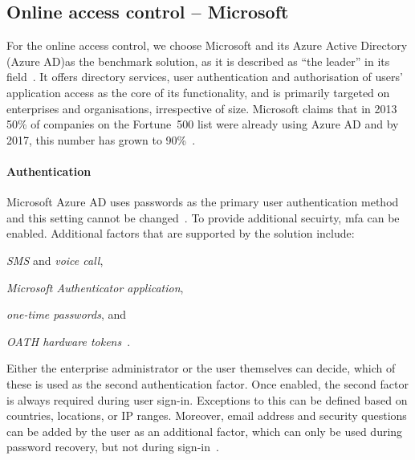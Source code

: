 \subsection{Online access control -- Microsoft}\label{sec:online-access-control}

For the online access control, we choose Microsoft and its Azure Active Directory (Azure AD)\footnotemark as the benchmark solution, as it is described as ``the leader'' in its field~\cite{Kreizman2018MagicWorldwide}. It offers directory services, user authentication and authorisation of users' application access as the core of its functionality, and is primarily targeted on enterprises and organisations, irrespective of size. Microsoft claims that in 2013 50\% of companies on the Fortune~500 list were already using Azure AD and by 2017, this number has grown to 90\%~\cite{Martin201350Azure}.


\paragraph{Authentication} Microsoft Azure AD uses passwords as the primary user authentication method and this setting cannot be changed~\cite{Flores2019AuthenticationMethods}. To provide additional secuirty, \acrlong{mfa} can be enabled. Additional factors that are supported by the solution include:
\begin{enumerate*}[label=(\roman*)]
    \item \textit{SMS} and \textit{voice call},
    \item \textit{Microsoft Authenticator application},
    \item \textit{one-time passwords}, and 
    \item \textit{OATH hardware tokens}\footnotemark~\cite{Flores2019AuthenticationMethods}.
\end{enumerate*}

Either the enterprise administrator or the user themselves can decide, which of these is used as the second authentication factor. Once enabled, the second factor is always required during user sign-in. Exceptions to this can be defined based on countries, locations, or IP ranges. Moreover, email address and security questions can be added by the user as an additional factor, which can only be used during password recovery, but not during sign-in~\cite{eross-msft2018ConfigureAuthentication}.

